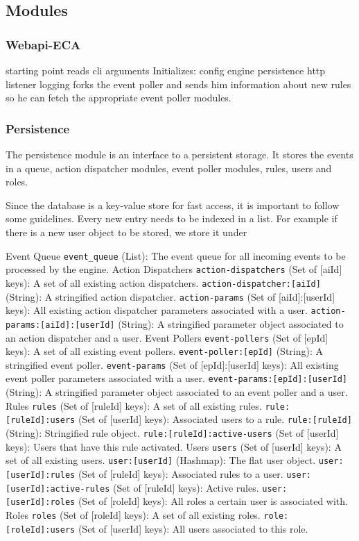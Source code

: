 \documentclass{article}
\begin{document}
\subsection{Modules}
\subsubsection{Webapi-ECA}
starting point
reads cli arguments
Initializes:
config
engine
persistence
http listener
logging
forks the event poller and sends him information about new rules so he can fetch the appropriate event poller modules.

\subsubsection{Persistence}
The persistence module is an interface to a persistent storage.
It stores the events in a queue, action dispatcher modules, event poller modules, rules, users and roles.

Since the database is a key-value store for fast access, it is important to follow some guidelines. Every new entry needs to be indexed in a list.
For example if there is a new user object to be stored, we store it under 


Event Queue
\texttt{event\_queue} (List): The event queue for all incoming events to be processed by the engine.
Action Dispatchers
\texttt{action-dispatchers} (Set of [aiId] keys): A set of all existing action dispatchers.
\texttt{action-dispatcher:[aiId]} (String): A stringified action dispatcher.
\texttt{action-params} (Set of [aiId]:[userId] keys): All existing action dispatcher parameters associated with a user.
\texttt{action-params:[aiId]:[userId]} (String): A stringified parameter object associated to an action dispatcher and a user.
Event Pollers
\texttt{event-pollers} (Set of [epId] keys): A set of all existing event pollers.
\texttt{event-poller:[epId]} (String): A stringified event poller.
\texttt{event-params} (Set of [epId]:[userId] keys): All existing event poller parameters associated with a user.
\texttt{event-params:[epId]:[userId]} (String): A stringified parameter object associated to an event poller and a user.
Rules
\texttt{rules} (Set of [ruleId] keys): A set of all existing rules.
\texttt{rule:[ruleId]:users} (Set of [userId] keys): Associated users to a rule.
\texttt{rule:[ruleId]} (String): Stringified rule object.
\texttt{rule:[ruleId]:active-users} (Set of [userId] keys): Users that have this rule activated.
Users
\texttt{users} (Set of [userId] keys): A set of all existing users.
\texttt{user:[userId]} (Hashmap): The flat user object.
\texttt{user:[userId]:rules} (Set of [ruleId] keys): Associated rules to a user.
\texttt{user:[userId]:active-rules} (Set of [ruleId] keys): Active rules.
\texttt{user:[userId]:roles} (Set of [roleId] keys): All roles a certain user is associated with.
Roles
\texttt{roles} (Set of [roleId] keys): A set of all existing roles.
\texttt{role:[roleId]:users} (Set of [userId] keys): All users associated to this role.
\end{document}
